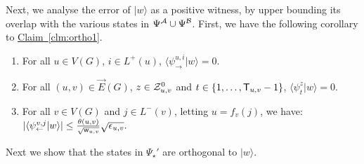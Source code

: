 \documentclass{article}
\newcommand{\clm}[1]{\hyperref[clm:#1]{Claim~\ref*{clm:#1}}}
\def\ket#1{{\lvert}#1\rangle}
\renewcommand{\>}{\rangle}
\newcommand{\<}{\langle}
\renewcommand{\(}{\left(}
\renewcommand{\)}{\right)}
\def\braket#1#2{{{\langle}#1\vert}#2\rangle}
\def\w{{\sf w}}
\begin{document}
Next, we analyse the error of $\ket{w}$ as a positive witness, by upper bounding its overlap with the various states in $\Psi^{\cal A}\cup\Psi^{\cal B}$. 
First, we have the following corollary to \clm{ortho1}. 
\begin{corollary}\label{cor:ortho1}
\begin{enumerate}
\item For all $u\in V(G)$, $i\in L^+(u)$, $\braket{\psi_{\rightarrow}^{u,i}}{w}=0$.
\item For all $(u,v)\in\overrightarrow{E}(G)$, $z\in{\cal Z}_{u,v}^0$ and $t\in \{1,\dots,{\sf T}_{u,v}-1\}$, $\braket{\psi_{t}^z}{w}=0$.
\item For all $v\in V(G)$ and $j\in L^-(v)$, letting $u=f_v(j)$, we have: 
$|\braket{\psi_{\leftarrow}^{v,j}}{w}|\leq \frac{\theta(u,v)}{\sqrt{\w_{u,v}}}\sqrt{\epsilon_{u,v}}.$
\end{enumerate}
\end{corollary}

\noindent Next we show that the states in $\Psi_\star'$ are orthogonal to $\ket{w}$. 
\end{document}

